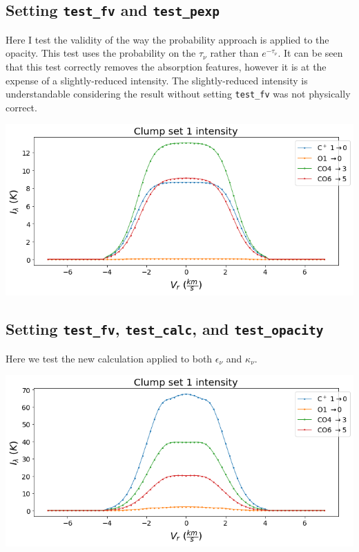 \documentclass[a4paper]{article}
\begin{document}
    \subsection{Setting \texttt{test\_fv} and \texttt{test\_pexp}}

    Here I test the validity of the way the probability approach is applied to the opacity.
    This test uses the probability on the \(\tau_\nu\) rather than \(e^{-\tau_\nu}\).
    It can be seen that this test correctly removes the absorption features, however it is at the expense of a slightly-reduced intensity.
    The slightly-reduced intensity is understandable considering the result without setting \texttt{test\_fv} was not physically correct.

    \includegraphics*[width=\linewidth]{voxel_error_fv-pexp.png}

    \subsection{Setting \texttt{test\_fv}, \texttt{test\_calc}, and \texttt{test\_opacity}}

    Here we test the new calculation applied to both \(\epsilon_\nu\) and \(\kappa_\nu\).

    \includegraphics*[width=\linewidth]{voxel_error_fv-calc-opacity.png}
\end{document}

